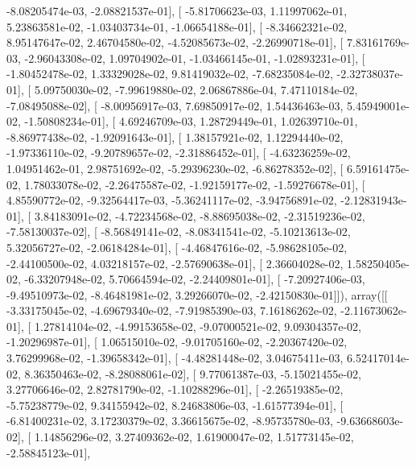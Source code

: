 \documentclass{article}
\begin{document}
         -8.08205474e-03,  -2.08821537e-01],
       [ -5.81706623e-03,   1.11997062e-01,   5.23863581e-02,
         -1.03403734e-01,  -1.06654188e-01],
       [ -8.34662321e-02,   8.95147647e-02,   2.46704580e-02,
         -4.52085673e-02,  -2.26990718e-01],
       [  7.83161769e-03,  -2.96043308e-02,   1.09704902e-01,
         -1.03466145e-01,  -1.02893231e-01],
       [ -1.80452478e-02,   1.33329028e-02,   9.81419032e-02,
         -7.68235084e-02,  -2.32738037e-01],
       [  5.09750030e-02,  -7.99619880e-02,   2.06867886e-04,
          7.47110184e-02,  -7.08495088e-02],
       [ -8.00956917e-03,   7.69850917e-02,   1.54436463e-03,
          5.45949001e-02,  -1.50808234e-01],
       [  4.69246709e-03,   1.28729449e-01,   1.02639710e-01,
         -8.86977438e-02,  -1.92091643e-01],
       [  1.38157921e-02,   1.12294440e-02,  -1.97336110e-02,
         -9.20789657e-02,  -2.31886452e-01],
       [ -4.63236259e-02,   1.04951462e-01,   2.98751692e-02,
         -5.29396230e-02,  -6.86278352e-02],
       [  6.59161475e-02,   1.78033078e-02,  -2.26475587e-02,
         -1.92159177e-02,  -1.59276678e-01],
       [  4.85590772e-02,  -9.32564417e-03,  -5.36241117e-02,
         -3.94756891e-02,  -2.12831943e-01],
       [  3.84183091e-02,  -4.72234568e-02,  -8.88695038e-02,
         -2.31519236e-02,  -7.58130037e-02],
       [ -8.56849141e-02,  -8.08341541e-02,  -5.10213613e-02,
          5.32056727e-02,  -2.06184284e-01],
       [ -4.46847616e-02,  -5.98628105e-02,  -2.44100500e-02,
          4.03218157e-02,  -2.57690638e-01],
       [  2.36604028e-02,   1.58250405e-02,  -6.33207948e-02,
          5.70664594e-02,  -2.24409801e-01],
       [ -7.20927406e-03,  -9.49510973e-02,  -8.46481981e-02,
          3.29266070e-02,  -2.42150830e-01]]), array([[ -3.33175045e-02,  -4.69679340e-02,  -7.91985390e-03,
          7.16186262e-02,  -2.11673062e-01],
       [  1.27814104e-02,  -4.99153658e-02,  -9.07000521e-02,
          9.09304357e-02,  -1.20296987e-01],
       [  1.06515010e-02,  -9.01705160e-02,  -2.20367420e-02,
          3.76299968e-02,  -1.39658342e-01],
       [ -4.48281448e-02,   3.04675411e-03,   6.52417014e-02,
          8.36350463e-02,  -8.28088061e-02],
       [  9.77061387e-03,  -5.15021455e-02,   3.27706646e-02,
          2.82781790e-02,  -1.10288296e-01],
       [ -2.26519385e-02,  -5.75238779e-02,   9.34155942e-02,
          8.24683806e-03,  -1.61577394e-01],
       [ -6.81400231e-02,   3.17230379e-02,   3.36615675e-02,
         -8.95735780e-03,  -9.63668603e-02],
       [  1.14856296e-02,   3.27409362e-02,   1.61900047e-02,
          1.51773145e-02,  -2.58845123e-01],
\end{document}
